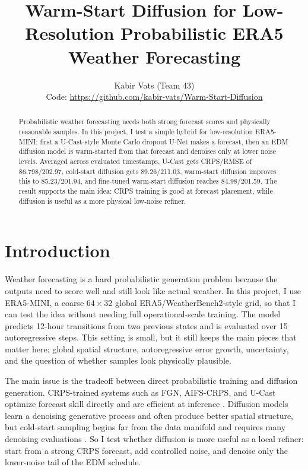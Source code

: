 \documentclass{article}
\title{Warm-Start Diffusion for Low-Resolution Probabilistic ERA5 Weather Forecasting}
\author{%
  Kabir Vats (Team 43)\\
  \small Code: \url{https://github.com/kabir-vats/Warm-Start-Diffusion}
}
\begin{document}
\maketitle

\begin{abstract}
Probabilistic weather forecasting needs both strong forecast scores and physically reasonable samples. In this project, I test a simple hybrid for low-resolution ERA5-MINI: first a U-Cast-style Monte Carlo dropout U-Net makes a forecast, then an EDM diffusion model is warm-started from that forecast and denoises only at lower noise levels. Averaged across evaluated timestamps, U-Cast gets CRPS/RMSE of 86.798/202.97, cold-start diffusion gets 89.26/211.03, warm-start diffusion improves this to 85.23/201.94, and fine-tuned warm-start diffusion reaches 84.98/201.59. The result supports the main idea: CRPS training is good at forecast placement, while diffusion is useful as a more physical low-noise refiner.
\end{abstract}

\section{Introduction}

Weather forecasting is a hard probabilistic generation problem because the outputs need to score well and still look like actual weather. In this project, I use ERA5-MINI, a coarse $64\times32$ global ERA5/WeatherBench2-style grid, so that I can test the idea without needing full operational-scale training. The model predicts 12-hour transitions from two previous states and is evaluated over 15 autoregressive steps. This setting is small, but it still keeps the main pieces that matter here: global spatial structure, autoregressive error growth, uncertainty, and the question of whether samples look physically plausible.

The main issue is the tradeoff between direct probabilistic training and diffusion generation. CRPS-trained systems such as FGN, AIFS-CRPS, and U-Cast optimize forecast skill directly and are efficient at inference \citep{alet2025fgn,lang2026aifscrps,cachay2026ucast}. Diffusion models learn a denoising generative process and often produce better spatial structure, but cold-start sampling begins far from the data manifold and requires many denoising evaluations \citep{ho2020ddpm,price2025gencast,brenowitz2025cbottle}. So I test whether diffusion is more useful as a local refiner: start from a strong CRPS forecast, add controlled noise, and denoise only the lower-noise tail of the EDM schedule.
\end{document}
